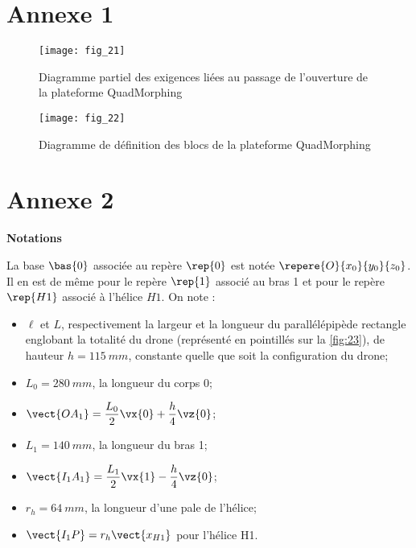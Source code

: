 \ifprof
\begin{corrige}
\end{corrige}
\else
\fi


\newpage

\section*{Annexe 1}


\begin{figure}[H]
\centering
\texttt{[image: fig\_21]}
\caption{\label{fig:21} Diagramme partiel des exigences liées au passage de l’ouverture de la plateforme QuadMorphing}
\end{figure}

\begin{figure}[H]
\centering
\texttt{[image: fig\_22]}
\caption{\label{fig:22} Diagramme de définition des blocs de la plateforme QuadMorphing}
\end{figure}

\newpage

\section*{Annexe 2}
\textbf{Notations}

La base $\bas{0}$ associée au repère $\rep{0}$ est notée $\repere{O}{x_0}{y_0}{z_0}$. Il en est de même pour le repère $\rep{1}$ associé au bras 1 et pour le repère $\rep{H1}$ associé à l’hélice $H1$. On note :
\begin{itemize}
\item $\ell$ et $L$, respectivement la largeur et la longueur du parallélépipède rectangle englobant
la totalité du drone (représenté en pointillés sur la \autoref{fig:23}), de hauteur $h = \SI{115}{mm}$,
constante quelle que soit la configuration du drone;
\item $L_0 = \SI{280}{mm}$, la longueur du corps 0;
\item $\vect{­OA_1} = \dfrac{L_0}{2} \vx{0} + \dfrac{h}{4}\vz{0}$;
\item $L_1 = \SI{140}{mm}$, la longueur du bras 1;
\item $\vect{I_1A_1} = \dfrac{L_1}{2} \vx{1} - \dfrac{h}{4} \vz{0}$;
\item $r_h = \SI{64}{mm}$, la longueur d’une pale de l’hélice;
\item $\vect{I_1 P} = r_h \vect{x_{H1}}$ pour l’hélice H1.
\end{itemize}

